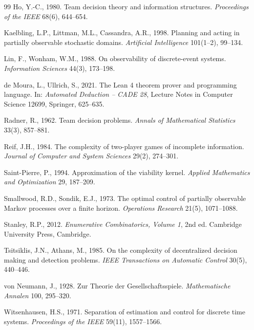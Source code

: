 \begin{thebibliography}{99}
 Ho, Y.-C., 1980. Team decision theory and information structures. \emph{Proceedings of the IEEE} 68(6), 644--654.

 Kaelbling, L.P., Littman, M.L., Cassandra, A.R., 1998. Planning and acting in partially observable stochastic domains. \emph{Artificial Intelligence} 101(1--2), 99--134.

 Lin, F., Wonham, W.M., 1988. On observability of discrete-event systems. \emph{Information Sciences} 44(3), 173--198.

 de Moura, L., Ullrich, S., 2021. The Lean 4 theorem prover and programming language. In: \emph{Automated Deduction -- CADE 28}, Lecture Notes in Computer Science 12699, Springer, 625--635.

 Radner, R., 1962. Team decision problems. \emph{Annals of Mathematical Statistics} 33(3), 857--881.

 Reif, J.H., 1984. The complexity of two-player games of incomplete information. \emph{Journal of Computer and System Sciences} 29(2), 274--301.

 Saint-Pierre, P., 1994. Approximation of the viability kernel. \emph{Applied Mathematics and Optimization} 29, 187--209.

 Smallwood, R.D., Sondik, E.J., 1973. The optimal control of partially observable Markov processes over a finite horizon. \emph{Operations Research} 21(5), 1071--1088.

 Stanley, R.P., 2012. \emph{Enumerative Combinatorics, Volume 1}, 2nd ed. Cambridge University Press, Cambridge.

 Tsitsiklis, J.N., Athans, M., 1985. On the complexity of decentralized decision making and detection problems. \emph{IEEE Transactions on Automatic Control} 30(5), 440--446.

 von Neumann, J., 1928. Zur Theorie der Gesellschaftsspiele. \emph{Mathematische Annalen} 100, 295--320.

 Witsenhausen, H.S., 1971. Separation of estimation and control for discrete time systems. \emph{Proceedings of the IEEE} 59(11), 1557--1566.
\end{thebibliography}


